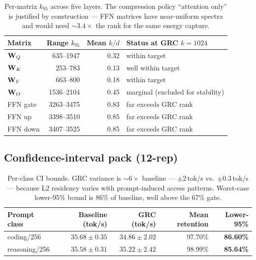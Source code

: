 \documentclass[11pt]{article}
\begin{document}
\begin{table}[h]\centering\footnotesize
\caption{Per-matrix $k_{95}$ across five layers. The compression policy
``attention only'' is justified by construction --- FFN matrices have
near-uniform spectra and would need ${\sim}3.4\times$ the rank for the
same energy capture.}
\begin{tabular}{@{}lrrl@{}}
\toprule
\textbf{Matrix} & \textbf{Range $k_{95}$} & \textbf{Mean $k/d$} & \textbf{Status at GRC $k{=}1024$}\\
\midrule
$\mathbf{W}_Q$    & 635--1947  & 0.32 & within target\\
$\mathbf{W}_K$    & 253--783   & 0.13 & well within target\\
$\mathbf{W}_V$    & 663--800   & 0.18 & within target\\
$\mathbf{W}_O$    & 1536--2104 & 0.45 & marginal (excluded for stability)\\
FFN gate     & 3263--3475 & 0.83 & far exceeds GRC rank\\
FFN up       & 3398--3510 & 0.85 & far exceeds GRC rank\\
FFN down     & 3407--3525 & 0.85 & far exceeds GRC rank\\
\bottomrule
\end{tabular}
\end{table}

\subsection{Confidence-interval pack (12-rep)}

\begin{table}[h]\centering\footnotesize
\caption{Per-class CI bounds. GRC variance is ${\sim}6\times$ baseline ---
$\pm 2$\,tok/s vs.\ $\pm 0.3$\,tok/s --- because L2 residency varies with
prompt-induced access patterns. Worst-case lower-95\% bound is 86\% of
baseline, well above the 67\% gate.}
\begin{tabular}{@{}lrrrr@{}}
\toprule
\textbf{Prompt class} & \textbf{Baseline (tok/s)} & \textbf{GRC (tok/s)} & \textbf{Mean retention} & \textbf{Lower-95\%}\\
\midrule
coding/256     & $35.68\!\pm\!0.35$ & $34.86\!\pm\!2.02$ & 97.70\% & \textbf{86.60\%}\\
reasoning/256  & $35.58\!\pm\!0.31$ & $35.22\!\pm\!2.42$ & 98.99\% & \textbf{85.64\%}\\
\bottomrule
\end{tabular}
\end{table}
\end{document}
